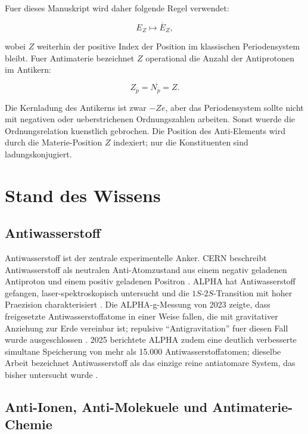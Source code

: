 \documentclass[11pt,a4paper]{article}
\newcommand{\Zanti}{\ensuremath{Z_{\bar p}}}
\begin{document}
Fuer dieses Manuskript wird daher folgende Regel verwendet:

\begin{equation}
E_Z \longmapsto \overline{E}_Z,
\end{equation}

wobei $Z$ weiterhin der positive Index der Position im klassischen Periodensystem bleibt. Fuer Antimaterie bezeichnet $Z$ operational die Anzahl der Antiprotonen im Antikern:

\begin{equation}
\Zanti = N_{\bar p} = Z.
\end{equation}

Die Kernladung des Antikerns ist zwar $-Ze$, aber das Periodensystem sollte nicht mit negativen oder ueberstrichenen Ordnungszahlen arbeiten. Sonst wuerde die Ordnungsrelation kuenstlich gebrochen. Die Position des Anti-Elements wird durch die Materie-Position $Z$ indexiert; nur die Konstituenten sind ladungskonjugiert.

\section{Stand des Wissens}

\subsection{Antiwasserstoff}

Antiwasserstoff ist der zentrale experimentelle Anker. CERN beschreibt Antiwasserstoff als neutralen Anti-Atomzustand aus einem negativ geladenen Antiproton und einem positiv geladenen Positron \cite{CERNstoring}. ALPHA hat Antiwasserstoff gefangen, laser-spektroskopisch untersucht und die $1S$-$2S$-Transition mit hoher Praezision charakterisiert \cite{ALPHA2018}. Die ALPHA-g-Messung von 2023 zeigte, dass freigesetzte Antiwasserstoffatome in einer Weise fallen, die mit gravitativer Anziehung zur Erde vereinbar ist; repulsive \enquote{Antigravitation} fuer diesen Fall wurde ausgeschlossen \cite{Anderson2023}. 2025 berichtete ALPHA zudem eine deutlich verbesserte simultane Speicherung von mehr als 15.000 Antiwasserstoffatomen; dieselbe Arbeit bezeichnet Antiwasserstoff als das einzige reine antiatomare System, das bisher untersucht wurde \cite{Akbari2025}.

\subsection{Anti-Ionen, Anti-Molekuele und Antimaterie-Chemie}
\end{document}
